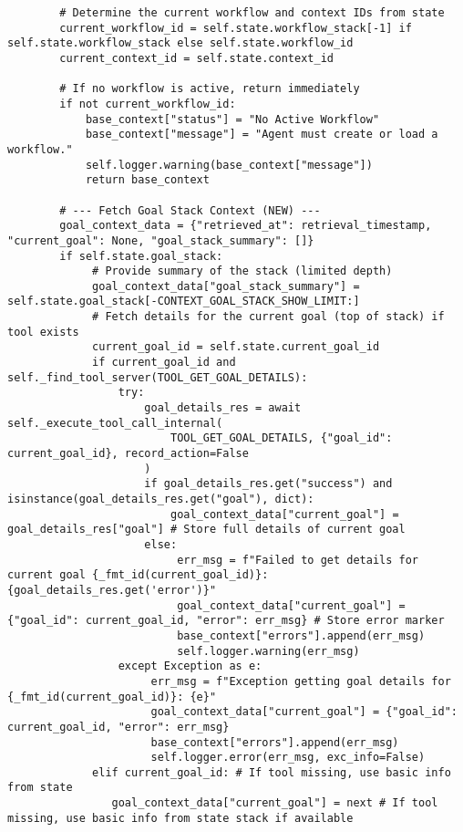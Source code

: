 \documentclass[12pt,a4paper]{article}
\begin{document}
\begin{pageablecode}
\begin{verbatim}
        # Determine the current workflow and context IDs from state
        current_workflow_id = self.state.workflow_stack[-1] if self.state.workflow_stack else self.state.workflow_id
        current_context_id = self.state.context_id

        # If no workflow is active, return immediately
        if not current_workflow_id:
            base_context["status"] = "No Active Workflow"
            base_context["message"] = "Agent must create or load a workflow."
            self.logger.warning(base_context["message"])
            return base_context

        # --- Fetch Goal Stack Context (NEW) ---
        goal_context_data = {"retrieved_at": retrieval_timestamp, "current_goal": None, "goal_stack_summary": []}
        if self.state.goal_stack:
             # Provide summary of the stack (limited depth)
             goal_context_data["goal_stack_summary"] = self.state.goal_stack[-CONTEXT_GOAL_STACK_SHOW_LIMIT:]
             # Fetch details for the current goal (top of stack) if tool exists
             current_goal_id = self.state.current_goal_id
             if current_goal_id and self._find_tool_server(TOOL_GET_GOAL_DETAILS):
                 try:
                     goal_details_res = await self._execute_tool_call_internal(
                         TOOL_GET_GOAL_DETAILS, {"goal_id": current_goal_id}, record_action=False
                     )
                     if goal_details_res.get("success") and isinstance(goal_details_res.get("goal"), dict):
                         goal_context_data["current_goal"] = goal_details_res["goal"] # Store full details of current goal
                     else:
                          err_msg = f"Failed to get details for current goal {_fmt_id(current_goal_id)}: {goal_details_res.get('error')}"
                          goal_context_data["current_goal"] = {"goal_id": current_goal_id, "error": err_msg} # Store error marker
                          base_context["errors"].append(err_msg)
                          self.logger.warning(err_msg)
                 except Exception as e:
                      err_msg = f"Exception getting goal details for {_fmt_id(current_goal_id)}: {e}"
                      goal_context_data["current_goal"] = {"goal_id": current_goal_id, "error": err_msg}
                      base_context["errors"].append(err_msg)
                      self.logger.error(err_msg, exc_info=False)
             elif current_goal_id: # If tool missing, use basic info from state
                goal_context_data["current_goal"] = next # If tool missing, use basic info from state stack if available

\end{verbatim}
\end{pageablecode}
\end{document}
